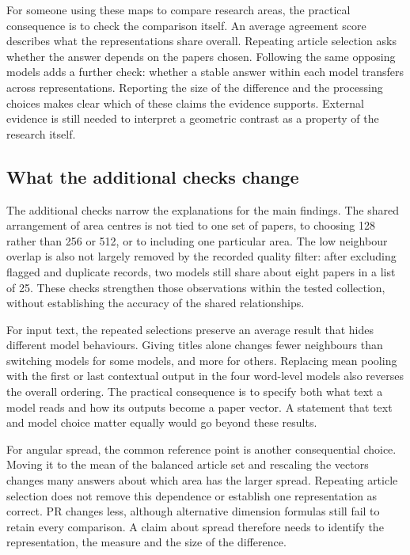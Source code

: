 \documentclass[12pt]{article}
\begin{document}
For someone using these maps to compare research areas, the practical consequence is to check the comparison itself. An average agreement score describes what the representations share overall. Repeating article selection asks whether the answer depends on the papers chosen. Following the same opposing models adds a further check: whether a stable answer within each model transfers across representations. Reporting the size of the difference and the processing choices makes clear which of these claims the evidence supports. External evidence is still needed to interpret a geometric contrast as a property of the research itself.

\subsection{What the additional checks change}
The additional checks narrow the explanations for the main findings. The shared arrangement of area centres is not tied to one set of papers, to choosing 128 rather than 256 or 512, or to including one particular area. The low neighbour overlap is also not largely removed by the recorded quality filter: after excluding flagged and duplicate records, two models still share about eight papers in a list of 25. These checks strengthen those observations within the tested collection, without establishing the accuracy of the shared relationships.

For input text, the repeated selections preserve an average result that hides different model behaviours. Giving titles alone changes fewer neighbours than switching models for some models, and more for others. Replacing mean pooling with the first or last contextual output in the four word-level models also reverses the overall ordering. The practical consequence is to specify both what text a model reads and how its outputs become a paper vector. A statement that text and model choice matter equally would go beyond these results.

For angular spread, the common reference point is another consequential choice. Moving it to the mean of the balanced article set and rescaling the vectors changes many answers about which area has the larger spread. Repeating article selection does not remove this dependence or establish one representation as correct. PR changes less, although alternative dimension formulas still fail to retain every comparison. A claim about spread therefore needs to identify the representation, the measure and the size of the difference.
\end{document}
